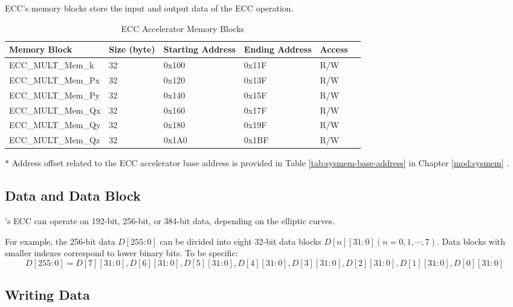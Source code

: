 \documentclass[main\_\_EN.tex]{subfiles}
\begin{document}
ECC's memory blocks store the input and output data of the ECC operation.

\begin{table}[H]
    \centering
    \caption{ECC Accelerator Memory Blocks} \label{tab:ecc-memory}
    \begin{threeparttable}
    \begin{tabular}{ | l | l | l | l | l | l | }
    \hline
        \rowcolor{lightgray}
        \textbf{Memory Block} & \textbf{Size (byte)}  &  \textbf{Starting Address}\tnote{*} &  \textbf{Ending Address} \tnote{*} & \textbf{Access}   \\ \hline
        ECC\_MULT\_Mem\_k    & 32  & 0x100 & 0x11F & R/W \\ \hline
        ECC\_MULT\_Mem\_Px   & 32  & 0x120 & 0x13F & R/W \\ \hline
        ECC\_MULT\_Mem\_Py   & 32  & 0x140 & 0x15F & R/W \\ \hline
        ECC\_MULT\_Mem\_Qx   & 32  & 0x160 & 0x17F & R/W \\ \hline
        ECC\_MULT\_Mem\_Qy   & 32  & 0x180 & 0x19F & R/W \\ \hline
        ECC\_MULT\_Mem\_Qz   & 32  & 0x1A0 & 0x1BF & R/W \\ \hline
    \end{tabular}
    \begin{tablenotes}
        \item[*] Address offset related to the ECC accelerator base address is provided in Table \ref{tab:sysmem-base-address} in Chapter \ref{mod:sysmem} \textit{}.
    \end{tablenotes}
    \end{threeparttable}
\end{table}


\subsection{Data and Data Block}

\chipname{}'s ECC can operate on 192-bit, 256-bit, or 384-bit data, depending on the elliptic curves.

For example, the 256-bit data $D[255:0]$ can be divided into eight 32-bit data blocks $D[n][31:0] (n=0, 1, \cdots, 7)$. Data blocks with smaller indexes correspond to lower binary bits. To be specific:
\[
D[255:0] = {D[7][31:0],D[6][31:0],D[5][31:0],
D[4][31:0],D[3][31:0],D[2][31:0],D[1][31:0],D[0][31:0]}
\]

\subsection{Writing Data}
\end{document}
